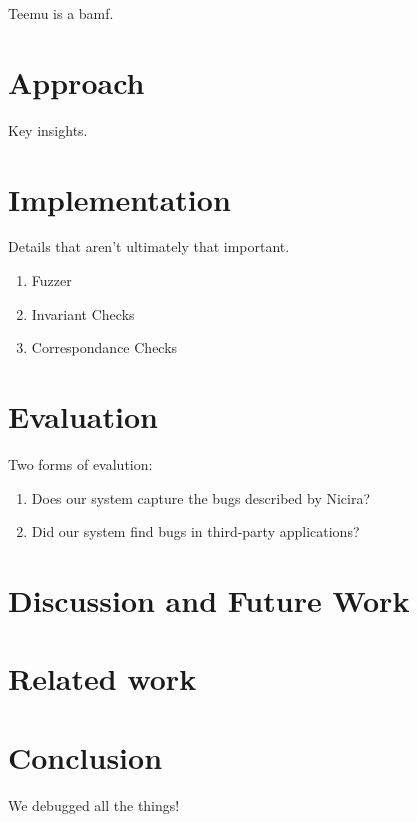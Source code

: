 \documentclass{sig-alternate-10pt}
\begin{document}
Teemu is a bamf.

\section{Approach}

Key insights.

\section{Implementation}

Details that aren't ultimately that important.

\begin{enumerate}
\item Fuzzer
\item Invariant Checks
\item Correspondance Checks
\end{enumerate}

\section{Evaluation}

Two forms of evalution:

\begin{enumerate}
\item Does our system capture the bugs described by Nicira?
\item Did our system find bugs in third-party applications?
\end{enumerate}

\section{Discussion and Future Work}
    \label{sec:future_work}
    

\section{Related work}
\label{sec:related_work}


\section{Conclusion}

We debugged all the things!




%
\end{document}

